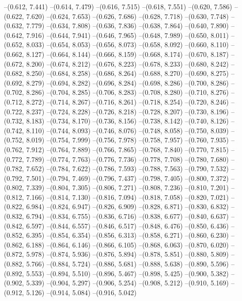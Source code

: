 --(0.612, 7.441)
--(0.614, 7.479)
--(0.616, 7.515)
--(0.618, 7.551)
--(0.620, 7.586)
--(0.622, 7.620)
--(0.624, 7.653)
--(0.626, 7.686)
--(0.628, 7.718)
--(0.630, 7.748)
--(0.632, 7.779)
--(0.634, 7.808)
--(0.636, 7.836)
--(0.638, 7.864)
--(0.640, 7.890)
--(0.642, 7.916)
--(0.644, 7.941)
--(0.646, 7.965)
--(0.648, 7.989)
--(0.650, 8.011)
--(0.652, 8.033)
--(0.654, 8.053)
--(0.656, 8.073)
--(0.658, 8.092)
--(0.660, 8.110)
--(0.662, 8.127)
--(0.664, 8.144)
--(0.666, 8.159)
--(0.668, 8.174)
--(0.670, 8.187)
--(0.672, 8.200)
--(0.674, 8.212)
--(0.676, 8.223)
--(0.678, 8.233)
--(0.680, 8.242)
--(0.682, 8.250)
--(0.684, 8.258)
--(0.686, 8.264)
--(0.688, 8.270)
--(0.690, 8.275)
--(0.692, 8.279)
--(0.694, 8.282)
--(0.696, 8.284)
--(0.698, 8.286)
--(0.700, 8.286)
--(0.702, 8.286)
--(0.704, 8.285)
--(0.706, 8.283)
--(0.708, 8.280)
--(0.710, 8.276)
--(0.712, 8.272)
--(0.714, 8.267)
--(0.716, 8.261)
--(0.718, 8.254)
--(0.720, 8.246)
--(0.722, 8.237)
--(0.724, 8.228)
--(0.726, 8.218)
--(0.728, 8.207)
--(0.730, 8.196)
--(0.732, 8.183)
--(0.734, 8.170)
--(0.736, 8.156)
--(0.738, 8.142)
--(0.740, 8.126)
--(0.742, 8.110)
--(0.744, 8.093)
--(0.746, 8.076)
--(0.748, 8.058)
--(0.750, 8.039)
--(0.752, 8.019)
--(0.754, 7.999)
--(0.756, 7.978)
--(0.758, 7.957)
--(0.760, 7.935)
--(0.762, 7.912)
--(0.764, 7.889)
--(0.766, 7.865)
--(0.768, 7.840)
--(0.770, 7.815)
--(0.772, 7.789)
--(0.774, 7.763)
--(0.776, 7.736)
--(0.778, 7.708)
--(0.780, 7.680)
--(0.782, 7.652)
--(0.784, 7.622)
--(0.786, 7.593)
--(0.788, 7.563)
--(0.790, 7.532)
--(0.792, 7.501)
--(0.794, 7.469)
--(0.796, 7.437)
--(0.798, 7.405)
--(0.800, 7.372)
--(0.802, 7.339)
--(0.804, 7.305)
--(0.806, 7.271)
--(0.808, 7.236)
--(0.810, 7.201)
--(0.812, 7.166)
--(0.814, 7.130)
--(0.816, 7.094)
--(0.818, 7.058)
--(0.820, 7.021)
--(0.822, 6.984)
--(0.824, 6.947)
--(0.826, 6.909)
--(0.828, 6.871)
--(0.830, 6.832)
--(0.832, 6.794)
--(0.834, 6.755)
--(0.836, 6.716)
--(0.838, 6.677)
--(0.840, 6.637)
--(0.842, 6.597)
--(0.844, 6.557)
--(0.846, 6.517)
--(0.848, 6.476)
--(0.850, 6.436)
--(0.852, 6.395)
--(0.854, 6.354)
--(0.856, 6.313)
--(0.858, 6.271)
--(0.860, 6.230)
--(0.862, 6.188)
--(0.864, 6.146)
--(0.866, 6.105)
--(0.868, 6.063)
--(0.870, 6.020)
--(0.872, 5.978)
--(0.874, 5.936)
--(0.876, 5.894)
--(0.878, 5.851)
--(0.880, 5.809)
--(0.882, 5.766)
--(0.884, 5.724)
--(0.886, 5.681)
--(0.888, 5.638)
--(0.890, 5.596)
--(0.892, 5.553)
--(0.894, 5.510)
--(0.896, 5.467)
--(0.898, 5.425)
--(0.900, 5.382)
--(0.902, 5.339)
--(0.904, 5.297)
--(0.906, 5.254)
--(0.908, 5.212)
--(0.910, 5.169)
--(0.912, 5.126)
--(0.914, 5.084)
--(0.916, 5.042)
